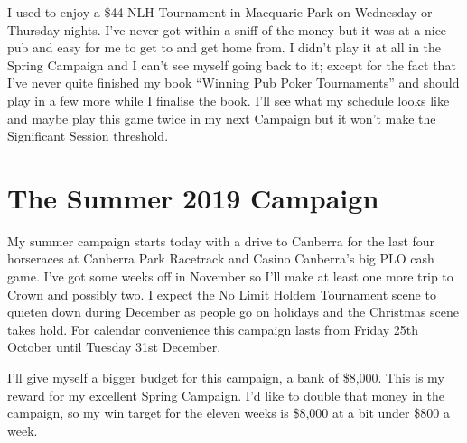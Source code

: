 I used to enjoy a \$44 NLH Tournament in Macquarie Park on Wednesday
or Thursday nights. I've never got within a sniff of the money but it
was at a nice pub and easy for me to get to and get home from. I
didn't play it at all in the Spring Campaign and I can't see myself
going back to it; except for the fact that I've never quite finished
my book ``Winning Pub Poker Tournaments'' and should play in a few
more while I finalise the book. I'll see what my schedule looks like
and maybe play this game twice in my next Campaign but it won't make
the Significant Session threshold.

\section*{The Summer 2019 Campaign}

My summer campaign starts today with a drive to Canberra for the
last four horseraces at Canberra Park Racetrack and Casino Canberra's
big PLO cash game. I've got some weeks off in November so I'll make
at least one more trip to Crown and possibly two. I expect the No
Limit Holdem Tournament scene to quieten down during December as
people go on holidays and the Christmas scene takes hold. For calendar
convenience this campaign lasts from Friday 25th October until Tuesday
31st December.

I'll give myself a bigger budget for this campaign, a bank of
\$8,000. This is my reward for my excellent Spring Campaign. I'd like
to double that money in the campaign, so my win target for the eleven
weeks is \$8,000 at a bit under \$800 a week.
